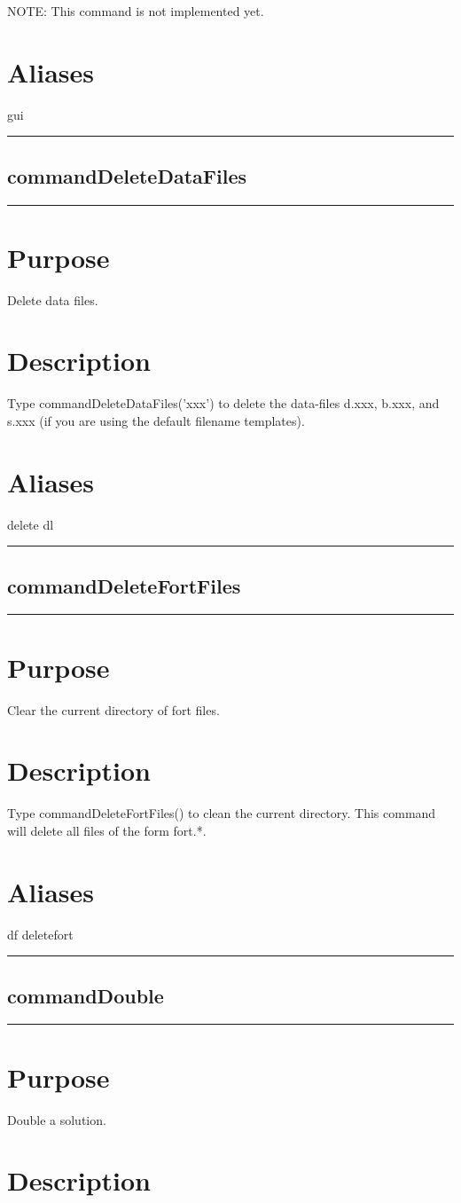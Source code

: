 \documentclass[12pt]{report}
\begin{document}
\begin{minipage}{6in}
    NOTE: This command is not implemented yet.
    \section*{Aliases}
gui \medskip\hrule\end{minipage}\subsection{commandDeleteDataFiles} \label{sec:clui_ref_commandDeleteDataFiles}\begin{minipage}{6in}\hrule\medskip\section*{Purpose}
Delete data files.\section*{Description}

    Type commandDeleteDataFiles('xxx') to delete the data-files d.xxx, b.xxx, and s.xxx
    (if you are using the default filename templates).
    \section*{Aliases}
delete dl \medskip\hrule\end{minipage}\subsection{commandDeleteFortFiles} \label{sec:clui_ref_commandDeleteFortFiles}\begin{minipage}{6in}\hrule\medskip\section*{Purpose}
Clear the current directory of fort files.\section*{Description}

    Type commandDeleteFortFiles() to clean the current directory.  This command will
    delete all files of the form fort.*.
    \section*{Aliases}
df deletefort \medskip\hrule\end{minipage}\subsection{commandDouble} \label{sec:clui_ref_commandDouble}\begin{minipage}{6in}\hrule\medskip\section*{Purpose}
Double a solution.\section*{Description}


\end{minipage}
\end{document}
